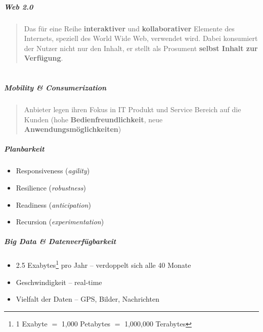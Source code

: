 \documentclass[a4paper]{article}
\begin{document}
			\subsubsection{Web 2.0}
			\begin{quote}
				Das für eine Reihe \textbf{interaktiver} und \textbf{kollaborativer} Elemente des Internets, speziell des World Wide Web, verwendet wird. Dabei konsumiert der Nutzer nicht nur den Inhalt, er stellt als Prosument \textbf{selbst Inhalt zur Verfügung}.
			\end{quote}
			\part*{}
			\hrulefill
			\subsubsection{Mobility \& Consumerization}
			\begin{quote}
				Anbieter legen ihren Fokus in IT Produkt und Service Bereich auf die Kunden (hohe \textbf{Bedienfreundlichkeit}, neue \textbf{Anwendungsmöglichkeiten})	
			\end{quote}
			
			\hrulefill
			
			\subsubsection{Planbarkeit}
			\begin{itemize}
				\item Responsiveness (\textit{agility})
				\item Resilience (\textit{robustness}) 
				\item Readiness (\textit{anticipation}) 
				\item Recursion (\textit{experimentation})
			\end{itemize}
			\hrulefill
			
			\subsubsection{Big Data \& Datenverfügbarkeit}
			\begin{itemize}
				\item 2.5 Exabytes\footnote{1 Exabyte $=$ 1,000 Petabytes $=$ 1,000,000 Terabytes} pro Jahr -- verdoppelt sich alle 40 Monate
				\item Geschwindigkeit -- real-time
				\item Vielfalt der Daten -- GPS, Bilder, Nachrichten
			\end{itemize}
			\hrulefill
			
\end{document}

